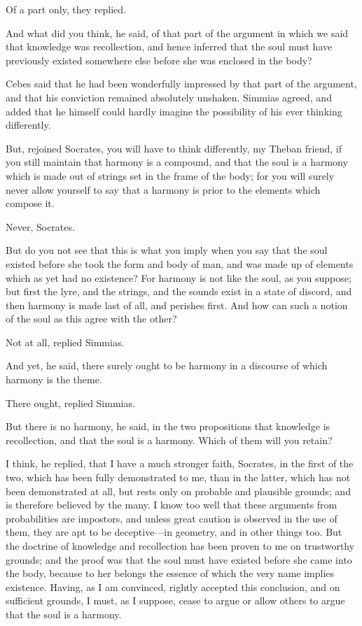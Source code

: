 Of a part only, they replied.

And what did you think, he said, of that part of the argument in which we
said that knowledge was recollection, and hence inferred that the soul
must have previously existed somewhere else before she was enclosed in the
body?

Cebes said that he had been wonderfully impressed by that part of the
argument, and that his conviction remained absolutely unshaken. Simmias
agreed, and added that he himself could hardly imagine the possibility of
his ever thinking differently.

But, rejoined Socrates, you will have to think differently, my Theban
friend, if you still maintain that harmony is a compound, and that the
soul is a harmony which is made out of strings set in the frame of the
body; for you will surely never allow yourself to say that a harmony is
prior to the elements which compose it.

Never, Socrates.

But do you not see that this is what you imply when you say that the soul
existed before she took the form and body of man, and was made up of
elements which as yet had no existence? For harmony is not like the soul,
as you suppose; but first the lyre, and the strings, and the sounds exist
in a state of discord, and then harmony is made last of all, and perishes
first. And how can such a notion of the soul as this agree with the other?

Not at all, replied Simmias.

And yet, he said, there surely ought to be harmony in a discourse of which
harmony is the theme.

There ought, replied Simmias.

But there is no harmony, he said, in the two propositions that knowledge
is recollection, and that the soul is a harmony. Which of them will you
retain?

I think, he replied, that I have a much stronger faith, Socrates, in the
first of the two, which has been fully demonstrated to me, than in the
latter, which has not been demonstrated at all, but rests only on probable
and plausible grounds; and is therefore believed by the many. I know too
well that these arguments from probabilities are impostors, and unless
great caution is observed in the use of them, they are apt to be deceptive—in
geometry, and in other things too. But the doctrine of knowledge and
recollection has been proven to me on trustworthy grounds; and the proof
was that the soul must have existed before she came into the body, because
to her belongs the essence of which the very name implies existence.
Having, as I am convinced, rightly accepted this conclusion, and on
sufficient grounds, I must, as I suppose, cease to argue or allow others
to argue that the soul is a harmony.

